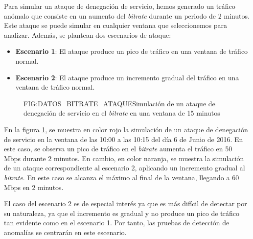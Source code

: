 Para simular un ataque de denegación de servicio, hemos generado un tráfico anómalo que consiste en un aumento del \textit{bitrate} durante un periodo de 2 minutos. Este ataque se puede simular en cualquier ventana que seleccionemos para analizar. Además, se plantean dos escenarios de ataque:
\begin{itemize}
    \item \textbf{Escenario 1}: El ataque produce un pico de tráfico en una ventana de tráfico normal.
    \item \textbf{Escenario 2}: El ataque produce un incremento gradual del tráfico en una ventana de tráfico normal.
\end{itemize}

\begin{figure}[Simulación de un ataque de denegación de servicio en el \textit{bitrate} en una ventana de 15 minutos]{FIG:DATOS_BITRATE_ATAQUE}{Simulación de un ataque de denegación de servicio en el \textit{bitrate} en una ventana de 15 minutos}
    \label{FIG:DATOS_BITRATE_ATAQUE}
\end{figure}

En la figura \ref{FIG:DATOS_BITRATE_ATAQUE}, se muestra en color rojo la simulación de un ataque de denegación de servicio en la ventana de las 10:00 a las 10:15 del día 6 de Junio de 2016. En este caso, se observa un pico de tráfico en el \textit{bitrate} aumenta el tráfico en 50 Mbps durante 2 minutos.
En cambio, en color naranja, se muestra la simulación de un ataque correspondiente al escenario 2, aplicando un incremento gradual al \textit{bitrate}. En este caso se alcanza el máximo al final de la ventana, llegando a 60 Mbps en 2 minutos.

El caso del escenario 2 es de especial interés ya que es más difícil de detectar por su naturaleza, ya que el incremento es gradual y no produce un pico de tráfico tan evidente como en el escenario 1. Por tanto, las pruebas de detección de anomalías se centrarán en este escenario.